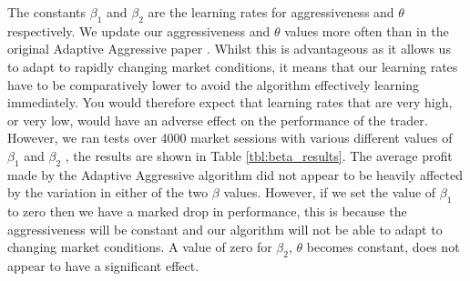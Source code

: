 \documentclass[preprint]{acm_proc_article-sp} %
\begin{document}
The constants $\beta_1$ and $\beta_2$ are the learning rates for aggressiveness
and $\theta$ respectively.  We update our aggressiveness and $\theta$ values
more often than in the original Adaptive Aggressive paper \cite{AA_thesis}.
Whilst this is advantageous as it allows us to adapt to rapidly changing market
conditions, it means that our learning rates have to be comparatively lower to
avoid the algorithm effectively learning immediately. You would therefore
expect that learning rates that are very high, or very low, would have an
adverse effect on the performance of the trader. However, we ran tests over
4000 market sessions with various different values of $\beta_1$ and
$\beta_2$ , the results are shown in Table \ref{tbl:beta_results}.  The average
profit made by the Adaptive Aggressive algorithm did not appear to be heavily
affected by the variation in either of the two $\beta$ values.  However, if we
set the value of $\beta_1$ to zero then we have a marked drop in performance,
this is because the aggressiveness will be constant and our algorithm will not
be able to adapt to changing market conditions. A value of zero for $\beta_2$,
$\theta$ becomes constant, does not appear to have a significant effect. 
\end{document}
